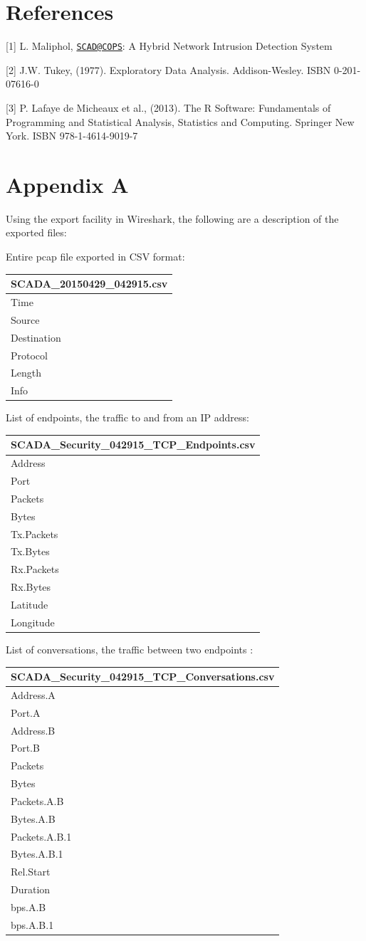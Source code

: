 \documentclass[]{article}
\begin{document}
\pagebreak

\section{References}\label{references}

{[}1{]} L. Maliphol, \href{mailto:SCAD@COPS}{\nolinkurl{SCAD@COPS}}: A
Hybrid Network Intrusion Detection System

{[}2{]} J.W. Tukey, (1977). Exploratory Data Analysis. Addison-Wesley.
ISBN 0-201-07616-0

{[}3{]} P. Lafaye de Micheaux et al., (2013). The R Software:
Fundamentals of Programming and Statistical Analysis, Statistics and
Computing. Springer New York. ISBN 978-1-4614-9019-7

\pagebreak

\section{Appendix A}\label{appendix-a}

Using the export facility in Wireshark, the following are a description
of the exported files:

Entire pcap file exported in CSV format:

\begin{longtable}[c]{@{}l@{}}
\toprule
SCADA\_20150429\_042915.csv\tabularnewline
\midrule
\endhead
Time\tabularnewline
Source\tabularnewline
Destination\tabularnewline
Protocol\tabularnewline
Length\tabularnewline
Info\tabularnewline
\bottomrule
\end{longtable}

List of endpoints, the traffic to and from an IP address:

\begin{longtable}[c]{@{}l@{}}
\toprule
SCADA\_Security\_042915\_TCP\_Endpoints.csv\tabularnewline
\midrule
\endhead
Address\tabularnewline
Port\tabularnewline
Packets\tabularnewline
Bytes\tabularnewline
Tx.Packets\tabularnewline
Tx.Bytes\tabularnewline
Rx.Packets\tabularnewline
Rx.Bytes\tabularnewline
Latitude\tabularnewline
Longitude\tabularnewline
\bottomrule
\end{longtable}

List of conversations, the traffic between two endpoints :

\begin{longtable}[c]{@{}l@{}}
\toprule
SCADA\_Security\_042915\_TCP\_Conversations.csv\tabularnewline
\midrule
\endhead
Address.A\tabularnewline
Port.A\tabularnewline
Address.B\tabularnewline
Port.B\tabularnewline
Packets\tabularnewline
Bytes\tabularnewline
Packets.A.B\tabularnewline
Bytes.A.B\tabularnewline
Packets.A.B.1\tabularnewline
Bytes.A.B.1\tabularnewline
Rel.Start\tabularnewline
Duration\tabularnewline
bps.A.B\tabularnewline
bps.A.B.1\tabularnewline
\bottomrule
\end{longtable}
\end{document}
